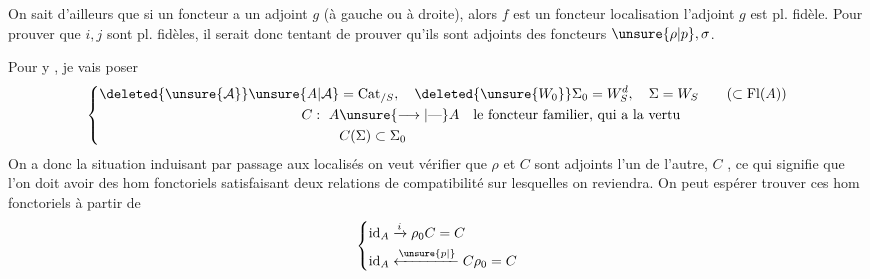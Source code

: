 On sait d'ailleurs que si un foncteur  a un adjoint $g$ (à gauche ou à droite), alors $f$ est un foncteur localisation  l'adjoint $g$ est pl. fidèle. Pour prouver que $i,j$ sont pl. fidèles, il serait donc tentant de prouver qu'ils sont adjoints des foncteurs $\unsure{\rho|p},\sigma$.

Pour  y , je vais poser
\[
 \left\{\begin{aligned}
 \deleted{\unsure{\mathcal A}}\unsure{A|\mathcal A}&=\mathrm{Cat}_{/S},\quad
 \deleted{\unsure{W_0}}\Sigma_0=W_S^d,\quad\Sigma=W_S\qquad(\subset\mathrm{Fl}(A))\\
 C:\ A&\unsure{\longrightarrow|\text{---}}A\quad\text{le foncteur familier, qui a la vertu}\\
 &C(\Sigma)\subset\Sigma_0
 \end{aligned}\right.
\]
On a donc la situation
induisant par passage aux localisés
on veut  vérifier que $\rho$ et $C$ sont adjoints l'un de l'autre, $C$ , ce qui signifie que l'on doit avoir des hom fonctoriels
satisfaisant deux relations de compatibilité sur lesquelles on reviendra. On peut espérer trouver ces  hom fonctoriels à partir de
\[
 \left\{\begin{aligned}
 \mathrm{id}_A&\xrightarrow{i}\rho_0 C=C\\
 \mathrm{id}_A&\xleftarrow{\unsure{p|{}}} C\rho_0=C
 \end{aligned}\right.
\]

